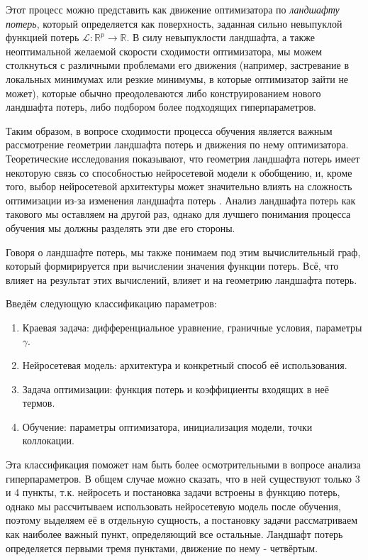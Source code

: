 \documentclass[a4paper, 12pt]{article}
\begin{document}
Этот процесс можно представить как движение оптимизатора по \textit{ландшафту потерь}, который определяется как поверхность, заданная сильно невыпуклой функцией потерь $\mathcal{L}: \mathbb{R}^{p} \to \mathbb{R}$. В силу невыпуклости ландшафта, а также неоптимальной желаемой скорости сходимости оптимизатора, мы можем столкнуться с различными проблемами его движения (например, застревание в локальных минимумах или резкие минимумы, в которые оптимизатор зайти не может), которые обычно преодолеваются либо конструированием нового ландшафта потерь, либо подбором более подходящих гиперпараметров. 

Таким образом, в вопросе сходимости процесса обучения является важным рассмотрение геометрии ландшафта потерь и движения по нему оптимизатора. Теоретические исследования показывают, что геометрия ландшафта потерь имеет некоторую связь со способностью нейросетевой модели к обобщению, и, кроме того, выбор нейросетевой архитектуры может значительно влиять на сложность оптимизации из-за изменения ландшафта потерь \cite{li2018visualizing}. Анализ ландшафта потерь как такового мы оставляем на другой раз, однако для лучшего понимания процесса обучения мы должны разделять эти две его стороны.

Говоря о ландшафте потерь, мы также понимаем под этим вычислительный граф, который формирируется при вычислении значения функции потерь. Всё, что влияет на результат этих вычислений, влияет и на геометрию ландшафта потерь.

Введём следующую классификацию параметров:
\begin{enumerate}
    \item Краевая задача: дифференциальное уравнение, граничные условия, параметры $\gamma$.
    \item Нейросетевая модель: архитектура и конкретный способ её использования.
    \item Задача оптимизации: функция потерь и коэффициенты входящих в неё термов.
    \item Обучение: параметры оптимизатора, инициализация модели, точки коллокации.
\end{enumerate}

Эта классификация поможет нам быть более осмотрительными в вопросе анализа гиперпараметров. В общем случае можно сказать, что в ней существуют только 3 и 4 пункты, т.к. нейросеть и постановка задачи встроены в функцию потерь, однако мы рассчитываем использовать нейросетевую модель после обучения, поэтому выделяем её в отдельную сущность, а постановку задачи рассматриваем как наиболее важный пункт, определяющий все остальные. Ландшафт потерь определяется первыми тремя пунктами, движение по нему - четвёртым.
\end{document}
